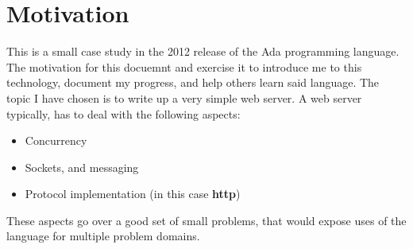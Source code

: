 \section{Motivation} 
This is a small case study in the 2012 release of the Ada programming language.
The motivation for this docuemnt and exercise it to introduce me to this 
technology, document my progress, and help others learn said language.
The topic I have chosen is to write up a very simple web server. A web server
typically, has to deal with the following aspects:
\begin{itemize}
\item Concurrency
\item Sockets, and messaging
\item Protocol implementation (in this case \textbf{http})
\end{itemize} 

These aspects go over a good set of small problems, that would expose uses of 
the language for multiple problem domains. 



